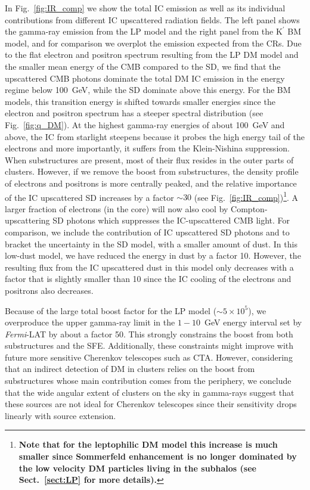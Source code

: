 \documentclass[10pt,aps,pra,reprint,amsmath,amsfonts,amssymb,showpacs,nofootinbib,floatfix]{revtex4-1}
\def\C#1{{\bf #1}}
\newcommand{\Fermi}{{\em Fermi}\xspace}
\newcommand{\rmn}{\mathrm}
\newcommand{\Kp}{\rmn{K}^\prime}
\begin{document}
In Fig.~\ref{fig:IR_comp} we show the total IC emission as well as its
individual contributions from different IC upscattered radiation
fields. The left panel shows the gamma-ray emission from the LP model
and the right panel from the $\Kp$ BM model, and for comparison we
overplot the emission expected from the CRs. Due to the flat electron
and positron spectrum resulting from the LP DM model and the smaller
mean energy of the CMB compared to the SD, we find that the
upscattered CMB photons dominate the total DM IC emission in the
energy regime below 100~GeV, while the SD dominate above this
energy. For the BM models, this transition energy is shifted towards
smaller energies since the electron and positron spectrum has a
steeper spectral distribution (see Fig.~\ref{fig:q_DM}). At the
highest gamma-ray energies of about 100~GeV and above, the IC from
starlight steepens because it probes the high energy tail of the
electrons and more importantly, it suffers from the Klein-Nishina
suppression. When substructures are present, most of their flux
resides in the outer parts of clusters. However, if we remove the
boost from substructures, the density profile of electrons and
positrons is more centrally peaked, and the relative importance of the
IC upscattered SD increases by a factor $\sim 30$ (see
Fig.~\ref{fig:IR_comp})\footnote{\C{Note that for the leptophilic DM
    model this increase is much smaller since Sommerfeld enhancement
    is no longer dominated by the low velocity DM particles living in
    the subhalos (see Sect.~\ref{sect:LP} for more details).}}.  A
larger fraction of electrons (in the core) will now also cool by
Compton-upscattering SD photons which suppresses the IC-upscattered
CMB light.  For comparison, we include the contribution of IC
upscattered SD photons and to bracket the uncertainty in the SD model,
with a smaller amount of dust. In this low-dust model, we have reduced
the energy in dust by a factor 10. However, the resulting flux from
the IC upscattered dust in this model only decreases with a factor
that is slightly smaller than 10 since the IC cooling of the electrons
and positrons also decreases.

Because of the large total boost factor for the LP model ($\sim5\times
10^5$), we overproduce the upper gamma-ray limit in the $1-10$~GeV
energy interval set by \Fermi-LAT by about a factor 50. This strongly
constrains the boost from both substructures and the
SFE. Additionally, these constraints might improve with future more
sensitive Cherenkov telescopes such as CTA. However, considering that
an indirect detection of DM in clusters relies on the boost from
substructures whose main contribution comes from the periphery, we
conclude that the wide angular extent of clusters on the sky in
gamma-rays suggest that these sources are not ideal for Cherenkov
telescopes since their sensitivity drops linearly with source
extension.
\end{document}
